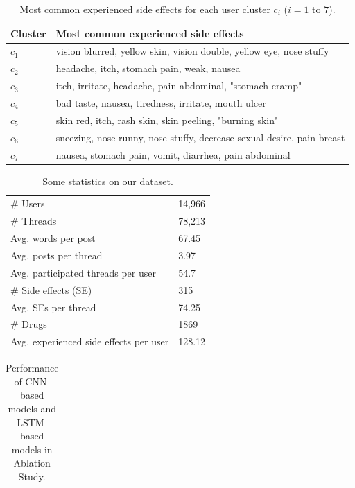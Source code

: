 \documentclass{bmcart}
\begin{document}
\begin{backmatter}
\begin{table}[h!]
    \caption{Most common experienced side effects for each user cluster $c_{i}$ ($i=1$ to $7$).}
    \begin{tabular}{l l} \hline
        Cluster & Most common experienced side effects \\ \hline
        $c_{1}$ & vision blurred, yellow skin, vision double, yellow eye, nose stuffy \\
        $c_{2}$ & headache, itch, stomach pain, weak, nausea \\
        $c_{3}$ & itch, irritate, headache, pain abdominal, "stomach cramp" \\
        $c_{4}$ & bad taste, nausea, tiredness, irritate, mouth ulcer \\
        $c_{5}$ & skin red, itch, rash skin, skin peeling, "burning skin" \\
        $c_{6}$ & sneezing, nose runny, nose stuffy, decrease sexual desire, pain breast \\
        $c_{7}$ & nausea, stomach pain, vomit, diarrhea, pain abdominal \\ \hline
    \end{tabular}
    \label{table:cluster_results}
\end{table}
\begin{table}[h!]
    \caption{Some statistics on our dataset.}
    \begin{tabular}{l l} \hline
        \# Users & 14,966 \\
        \# Threads & 78,213 \\
        Avg. words per post & 67.45 \\
        Avg. posts per thread & 3.97 \\
        Avg. participated threads per user & 54.7 \\
        \# Side effects (SE) & 315 \\
        Avg. SEs per thread & 74.25 \\
        \# Drugs & 1869 \\
        Avg. experienced side effects per user & 128.12 \\ \hline
    \end{tabular}
    \label{table:dataset_statistics}
\end{table}
\begin{table}[h!]
    \caption{Performance of CNN-based models and LSTM-based models in Ablation Study.}
  \scalebox{1.2}
  \footnotesize
  \begin{tabular}{l | c c c | c c c}

\end{tabular}
\end{table}
\end{backmatter}
\end{document}
